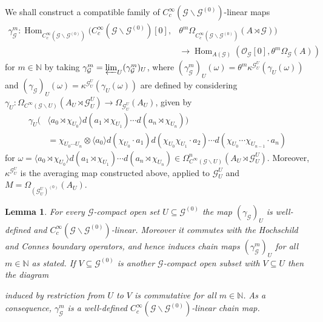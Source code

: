 \documentclass{amsart}
\newtheorem{lemma}[thm]{Lemma}
\newcommand{\G}{\mathcal{G}}
\renewcommand{\O}{\mathcal{O}}
\newcommand{\OG}{\mathcal{O}_{\mathcal{G}}}
\newcommand{\ccinfty}{C_c^\infty}
\newcommand{\cinfty}{C^\infty}
\DeclareMathOperator{\Hom}{Hom}
\begin{document}
We shall construct a compatible family of $ \ccinfty(\G \backslash \G^{(0)}) $-linear maps 
\begin{align*}
\gamma_\G^m: \Hom_{\ccinfty(\G \backslash \G^{(0)})}(\ccinfty(\G \backslash \G^{(0)})[0], &\theta^m \Omega_{\ccinfty(\G \backslash \G^{(0)})}(A \rtimes \G)) \\
&\rightarrow \Hom_{A(\G)}(\OG[0], \theta^m \Omega_\G(A))
\end{align*}
for $ m \in \mathbb{N} $
by taking $ \gamma_\G^m = \varprojlim_U (\gamma_\G^m)_U $, where $ (\gamma_\G^m)_U(\omega) = \theta^m \kappa^{\G_U^U}(\gamma_U(\omega)) $ and $ (\gamma_\G)_U(\omega) = \kappa^{\G_U^U}(\gamma_U(\omega)) $ are defined by 
considering $ \gamma_U: \Omega_{\cinfty(\G \backslash U)}(A_U \rtimes \G_U^U) \rightarrow \Omega_{\G^U_U}(A_U) $, given by 
\begin{align*}
\gamma_U(&\langle a_0 \rtimes \chi_{U_0} \rangle d(a_1 \rtimes \chi_{U_1}) \cdots d(a_n \rtimes \chi_{U_n}))\\
&= \chi_{U_0 \cdots U_n} \otimes \langle a_0 \rangle d(\chi_{U_0} \cdot a_1) d(\chi_{U_0} \chi_{U_1} \cdot a_2) \cdots d(\chi_{U_0} \cdots \chi_{U_{n - 1}} \cdot a_n)  
\end{align*}
for $ \omega = \langle a_0 \rtimes \chi_{U_0} \rangle d(a_1 \rtimes \chi_{U_1}) \cdots d(a_n \rtimes \chi_{U_n}) \in \Omega^n_{\cinfty(\G \backslash U)}(A_U \rtimes \G_U^U) $. 
Moreover, $ \kappa^{\G_U^U} $ is the averaging map constructed above, applied to $ \G_U^U $ and $ M = \Omega_{(\G^U_U)^{(0)}}(A_U) $.

\begin{lemma} \label{gammaboundary}
For every $ \G $-compact open set $ U \subseteq \G^{(0)} $ the map $ (\gamma_\G)_U $ is well-defined and $ \ccinfty(\G \backslash \G^{(0)}) $-linear. Moreover it 
commutes with the Hochschild and Connes boundary operators, and hence induces chain maps $ (\gamma^m_\G)_U $ for all $ m \in \mathbb{N} $ as stated. If $ V \subseteq \G^{(0)} $ is another $ \G $-compact open subset with $ V \subseteq U $ then the diagram 
\begin{center}
\end{center}
induced by restriction from $ U $ to $ V $ is commutative for all $ m \in \mathbb{N} $. 
As a consequence, $ \gamma^m_\G $ is a well-defined $ \ccinfty(\G \backslash \G^{(0)}) $-linear chain map. 
\end{lemma}
\end{document}

